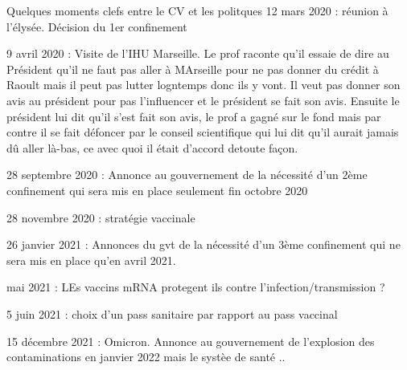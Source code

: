\documentclass[
  ignorenonframetext,
]{beamer}
\begin{document}
\begin{frame}{Quelques moments clefs entre le CV et les politques}
\protect\hypertarget{quelques-moments-clefs-entre-le-cv-et-les-politques}{}
12 mars 2020 : réunion à l'élysée. Décision du 1er confinement

9 avril 2020 : Visite de l'IHU Marseille. Le prof raconte qu'il essaie
de dire au Président qu'il ne faut pas aller à MArseille pour ne pas
donner du crédit à Raoult mais il peut pas lutter logntemps donc ils y
vont. Il veut pas donner son avis au président pour pas l'influencer et
le président se fait son avis. Ensuite le président lui dit qu'il s'est
fait son avis, le prof a gagné sur le fond mais par contre il se fait
défoncer par le conseil scientifique qui lui dit qu'il aurait jamais dû
aller là-bas, ce avec quoi il était d'accord detoute façon.

28 septembre 2020 : Annonce au gouvernement de la nécessité d'un 2ème
confinement qui sera mis en place seulement fin octobre 2020

28 novembre 2020 : stratégie vaccinale

26 janvier 2021 : Annonces du gvt de la nécessité d'un 3ème confinement
qui ne sera mis en place qu'en avril 2021.

mai 2021 : LEs vaccins mRNA protegent ils contre
l'infection/transmission ?

5 juin 2021 : choix d'un pass sanitaire par rapport au pass vaccinal

15 décembre 2021 : Omicron. Annonce au gouvernement de l'explosion des
contaminations en janvier 2022 mais le systèe de santé ..
\end{frame}
\end{document}
